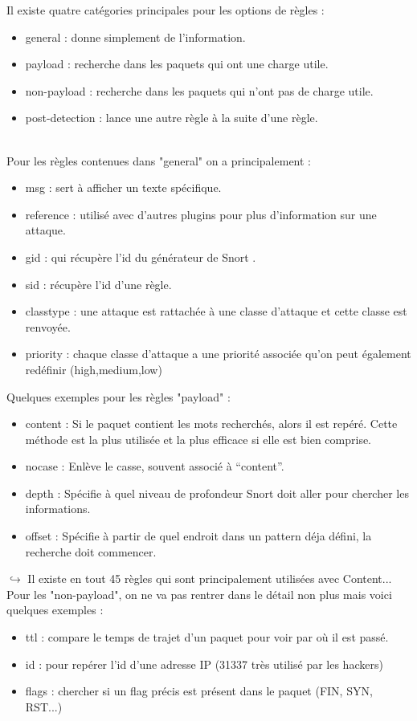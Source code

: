 \documentclass[a4paper,11pt,french]{article}
\begin{document}
Il existe quatre catégories principales pour les options de règles :
\begin{itemize}
\item general : donne simplement de l’information.
\item payload : recherche dans les paquets qui ont une charge utile.
\item non-payload : recherche dans les paquets qui n’ont pas de charge utile.
\item post-detection : lance une autre règle à la suite d’une règle.
\end{itemize}
~~\\
Pour les règles contenues dans "general" on a principalement :
\begin{itemize}
\item msg : sert à afficher un texte spécifique.
\item reference : utilisé avec d’autres plugins pour plus d’information sur une attaque.
\item gid : qui récupère l’id du générateur de Snort .
\item sid : récupère l’id d’une règle.
\item classtype : une attaque est rattachée à une classe d’attaque et cette classe est renvoyée.
\item priority : chaque classe d’attaque a une priorité associée qu’on peut également redéfinir (high,medium,low)
\end{itemize}

Quelques exemples pour les règles "payload" : 
\begin{itemize}
\item content : Si le paquet contient les mots recherchés, alors il est repéré. Cette méthode est la plus utilisée et la plus efficace si elle est bien comprise.
\item nocase : Enlève le casse, souvent associé à “content”.
\item depth : Spécifie à quel niveau de profondeur Snort doit aller pour chercher les informations.
\item offset : Spécifie à partir de quel endroit dans un pattern déja défini, la recherche doit commencer.
\end{itemize}


$\hookrightarrow$ Il existe en tout 45 règles qui sont principalement utilisées avec Content...\\


Pour les "non-payload", on ne va pas rentrer dans le détail non plus mais voici quelques exemples : 
\begin{itemize}
\item ttl : compare le temps de trajet d’un paquet pour voir par où il est passé.
\item id : pour repérer l’id d’une adresse IP (31337 très utilisé par les hackers)
\item flags : chercher si un flag précis est présent dans le paquet (FIN, SYN, RST...)
\end{itemize}
\end{document}
